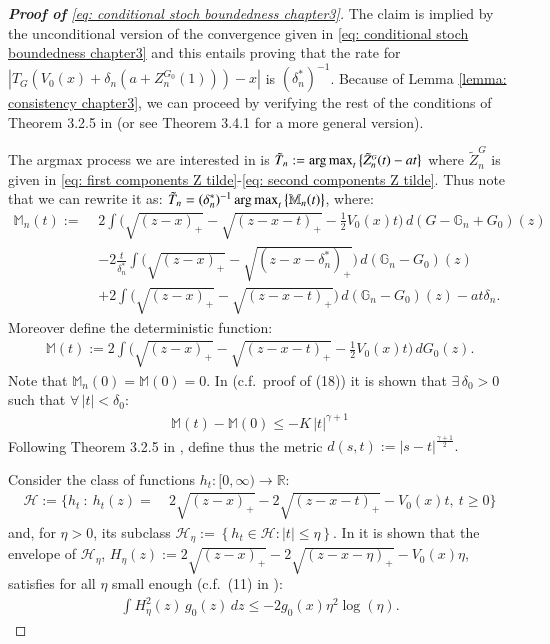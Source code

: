 	\begin{proof}[\hypertarget{proof of stoch boundedness}{\textbf{Proof of}} \eqref{eq: conditional stoch boundedness chapter3}]
		The claim is implied by the unconditional version of the convergence given in \eqref{eq: conditional stoch boundedness chapter3} and this entails proving that the rate for $\left| T_{\scriptscriptstyle{G}} \left( V_0(x) + \delta_n (a + Z^{\scriptscriptstyle{G_0}}_n(1)) \right) - x \right|$ is $\left( \delta_n^* \right)^{-1}$. Because of Lemma \ref{lemma: consistency chapter3}, we can proceed by verifying the rest of the conditions of Theorem 3.2.5 in \cite{5} (or see Theorem 3.4.1 for a more general version). 

		The argmax process we are interested in is $\tilde{T}_n :=  \operatorname*{arg\,max}_t \big\{ \tilde{Z}^{\scriptscriptstyle{G}}_n(t)-a t \big\}$ where $\tilde{Z}^{\scriptscriptstyle{G}}_n$ is given in \eqref{eq: first components Z tilde}-\eqref{eq: second components Z tilde}. Thus note that we can rewrite it as: $\tilde{T}_n = (\delta^*_n)^{-1} \operatorname*{arg\,max}_t \big\{ \mathbb{M}_n(t)\big\} $, where:
		\begin{align}\label{eq: mathbbM_n}
			\mathbb{M}_n(t) := \, \, &2 \int \bigg( \sqrt{(z-x)_+} - \sqrt{(z-x -t)_+} - \frac{1}{2} V_0(x)t \bigg) \, d (G - \mathbb{G}_n+G_0)(z)\\
			&- 2 \frac{t}{\delta^*_n}  \int \bigg( \sqrt{(z-x)_+} - \sqrt{(z-x -\delta^*_n)_+} \bigg) \, d (\mathbb{G}_n-G_0)(z) \\
			&+ 2  \int \bigg( \sqrt{(z-x)_+} - \sqrt{(z-x -t)_+} \bigg) \, d (\mathbb{G}_n-G_0)(z)  - at \delta_n .
		\end{align}
		Moreover define the deterministic function:
		\begin{align*}
			\mathbb{M}(t):= 2 \int \bigg( \sqrt{(z-x)_+} - \sqrt{(z-x -t)_+} - \frac{1}{2} V_0(x)t \bigg) \, d G_0(z).
		\end{align*}
		Note that $\mathbb{M}_n(0) = \mathbb{M}(0) = 0$. In \cite{27} (c.f.\ proof of (18)) it is shown that $\exists \, \delta_0>0$ such that $\forall \, |t|< \delta_0$:
		\begin{align}\label{eq: bound curvature}
			\mathbb{M}(t) - \mathbb{M}(0) \leq - K \, |t|^{\gamma +1}
		\end{align} 
		Following Theorem 3.2.5 in \cite{5}, define thus the metric $d(s,t) := |s-t|^{\frac{\gamma+1}{2}}.$

		Consider the class of functions $h_t :[0, \infty) \rightarrow \mathbb{R}$:
		\begin{align*}
		\mathscr{H} := \big\{h_t \: : \: h_t (z) =& \: 2 \sqrt{(z-x)_{+}} -2 \sqrt{(z-x-t)_{+}}  - V_0(x)t, \: t \geq 0 \big\}
		\end{align*}
		and, for $\eta>0$, its subclass $ \mathscr{H}_\eta :=\left\{h_t \in \mathscr{H}:|t| \leq \eta\right\}$. In \cite{1} it is shown that the envelope of $\mathscr{H}_\eta$, $H_{\eta} (z) := 2 \sqrt{(z-x)_{+}} -2 \sqrt{(z-x-\eta)_{+}} - V_0(x)\eta$, satisfies for all $\eta$ small enough (c.f.\ (11) in \cite{1}):
		\begin{align}\label{eq: bound envelope 1}
			\int H^2_{\eta}(z) \, g_0(z) \, dz \leq -2g_0(x) \eta^2 \log{(\eta)}.
		\end{align}


\end{proof}
